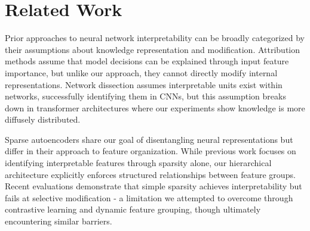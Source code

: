 \documentclass{article} %
\begin{document}
\section{Related Work}
\label{sec:related}





Prior approaches to neural network interpretability can be broadly categorized by their assumptions about knowledge representation and modification. Attribution methods \cite{Zeiler2013VisualizingAU, Ribeiro2016WhySI} assume that model decisions can be explained through input feature importance, but unlike our approach, they cannot directly modify internal representations. Network dissection \cite{Bau2017NetworkDQ} assumes interpretable units exist within networks, successfully identifying them in CNNs, but this assumption breaks down in transformer architectures where our experiments show knowledge is more diffusely distributed.

Sparse autoencoders \cite{Bengio2007LearningDA, Cunningham2023SparseAF} share our goal of disentangling neural representations but differ in their approach to feature organization. While previous work focuses on identifying interpretable features through sparsity alone, our hierarchical architecture explicitly enforces structured relationships between feature groups. Recent evaluations \cite{Makelov2024TowardsPE} demonstrate that simple sparsity achieves interpretability but fails at selective modification - a limitation we attempted to overcome through contrastive learning and dynamic feature grouping, though ultimately encountering similar barriers.
\end{document}
